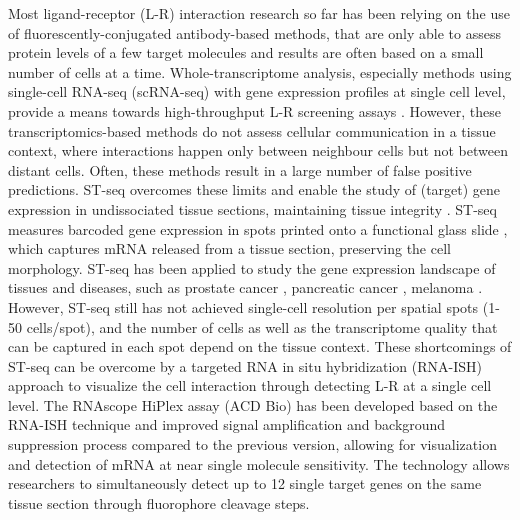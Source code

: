 Most ligand-receptor (L-R) interaction research so far has been relying on the use of fluorescently-conjugated antibody-based methods, that are only able to assess protein levels of a few target molecules and results are often based on a small number of cells at a time. Whole-transcriptome analysis, especially methods using single-cell RNA-seq (scRNA-seq) with gene expression profiles at single cell level, provide a means towards high-throughput L-R screening assays \cite{browaeys2020nichenet, efremova2020cellphonedb}. However, these transcriptomics-based methods do not assess cellular communication in a tissue context, where interactions happen only between neighbour cells but not between distant cells. Often, these methods result in a large number of false positive predictions. ST-seq overcomes these limits and enable the study of (target) gene expression in undissociated tissue sections, maintaining tissue integrity \cite{salmen2018barcoded}. ST-seq measures barcoded gene expression in spots printed onto a functional glass slide \cite{salmen2018barcoded}, which captures mRNA released from a tissue section, preserving the cell morphology.  ST-seq has been applied to study the gene expression landscape of tissues and diseases, such as prostate cancer \cite{berglund2018spatial, ji2020multimodal}, pancreatic cancer \cite{moncada2019integrating}, melanoma \cite{thrane2018spatially}. However, ST-seq still has not achieved single-cell resolution per spatial spots (1-50 cells/spot), and the number of cells as well as the transcriptome quality that can be captured in each spot depend on the tissue context. These shortcomings of ST-seq can be overcome by a targeted RNA in situ hybridization (RNA-ISH) approach to visualize the cell interaction through detecting L-R at a single cell level. The RNAscope HiPlex assay (ACD Bio) has been developed based on the RNA-ISH technique and improved signal amplification and background suppression process compared to the previous version, allowing for visualization and detection of mRNA at near single molecule sensitivity. The technology allows researchers to simultaneously detect up to 12 single target genes on the same tissue section through fluorophore cleavage steps.  

